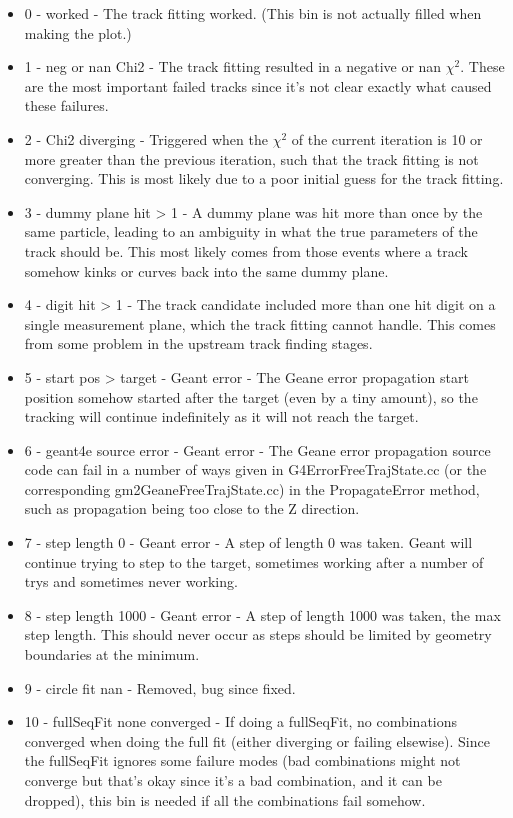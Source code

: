 \begin{enumerate}
\begin{itemize}
          \item{0 - worked} - The track fitting worked. (This bin is not actually filled when making the plot.)
          \item{1 - neg or nan Chi2} - The track fitting resulted in a negative or nan $\chi^{2}$. These are the most important failed tracks since it's not clear exactly what caused these failures.
          \item{2 - Chi2 diverging} - Triggered when the $\chi^{2}$ of the current iteration is 10 or more greater than the previous iteration, such that the track fitting is not converging. This is most likely due to a poor initial guess for the track fitting.
          \item{3 - dummy plane hit \textgreater{} 1} - A dummy plane was hit more than once by the same particle, leading to an ambiguity in what the true parameters of the track should be. This most likely comes from those events where a track somehow kinks or curves back into the same dummy plane.
          \item{4 - digit hit \textgreater{} 1} - The track candidate included more than one hit digit on a single measurement plane, which the track fitting cannot handle. This comes from some problem in the upstream track finding stages.
          \item{5 - start pos \textgreater{} target} - Geant error - The Geane error propagation start position somehow started after the target (even by a tiny amount), so the tracking will continue indefinitely as it will not reach the target.
          \item{6 - geant4e source error} - Geant error - The Geane error propagation source code can fail in a number of ways given in G4ErrorFreeTrajState.cc (or the corresponding gm2GeaneFreeTrajState.cc) in the PropagateError method, such as propagation being too close to the Z direction.
          \item{7 - step length 0} - Geant error - A step of length 0 was taken. Geant will continue trying to step to the target, sometimes working after a number of trys and sometimes never working.
          \item{8 - step length 1000} - Geant error - A step of length 1000 was taken, the max step length. This should never occur as steps should be limited by geometry boundaries at the minimum.
          \item{9 - circle fit nan} - Removed, bug since fixed.
          \item{10 - fullSeqFit none converged} - If doing a fullSeqFit, no combinations converged when doing the full fit (either diverging or failing elsewise). Since the fullSeqFit ignores some failure modes (bad combinations might not converge but that's okay since it's a bad combination, and it can be dropped), this bin is needed if all the combinations fail somehow.

\end{itemize}
\end{enumerate}
